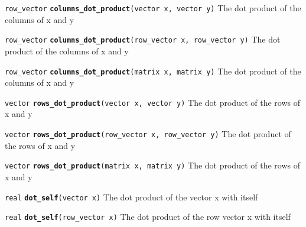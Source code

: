 \documentclass[
  10pt,
]{book}
\begin{document}
\texttt{row\_vector} \textbf{\texttt{columns\_dot\_product}}\texttt{(vector\ x,\ vector\ y)}\newline
The dot product of the columns of x and y


\texttt{row\_vector} \textbf{\texttt{columns\_dot\_product}}\texttt{(row\_vector\ x,\ row\_vector\ y)}\newline
The dot product of the columns of x and y


\texttt{row\_vector} \textbf{\texttt{columns\_dot\_product}}\texttt{(matrix\ x,\ matrix\ y)}\newline
The dot product of the columns of x and y


\texttt{vector} \textbf{\texttt{rows\_dot\_product}}\texttt{(vector\ x,\ vector\ y)}\newline
The dot product of the rows of x and y


\texttt{vector} \textbf{\texttt{rows\_dot\_product}}\texttt{(row\_vector\ x,\ row\_vector\ y)}\newline
The dot product of the rows of x and y


\texttt{vector} \textbf{\texttt{rows\_dot\_product}}\texttt{(matrix\ x,\ matrix\ y)}\newline
The dot product of the rows of x and y


\texttt{real} \textbf{\texttt{dot\_self}}\texttt{(vector\ x)}\newline
The dot product of the vector x with itself


\texttt{real} \textbf{\texttt{dot\_self}}\texttt{(row\_vector\ x)}\newline
The dot product of the row vector x with itself
\end{document}
